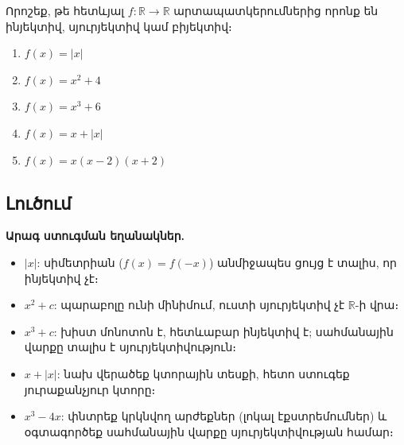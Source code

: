 \documentclass[12pt, a4paper]{article}
\newcommand{\R}{\mathbb{R}}
\begin{document}
\begin{theorybox}
\begin{center}
\end{center}
\end{theorybox}

\begin{problembox}
Որոշեք, թե հետևյալ $f : \R \to \R$ արտապատկերումներից որոնք են ինյեկտիվ, սյուրյեկտիվ կամ բիյեկտիվ։
\begin{enumerate}[label=(\alph*), nosep]
  \item $f(x) = |x|$
  \item $f(x) = x^2 + 4$
  \item $f(x) = x^3 + 6$
  \item $f(x) = x + |x|$
  \item $f(x) = x(x-2)(x+2)$
\end{enumerate}
\end{problembox}

\subsection*{Լուծում}

\textbf{Արագ ստուգման եղանակներ.}
\begin{itemize}[nosep]
  \item $|x|$: սիմետրիան ($f(x) = f(-x)$) անմիջապես ցույց է տալիս, որ ինյեկտիվ չէ։
  \item $x^2 + c$: պարաբոլը ունի մինիմում, ուստի սյուրյեկտիվ չէ $\mathbb{R}$-ի վրա։
  \item $x^3 + c$: խիստ մոնոտոն է, հետևաբար ինյեկտիվ է; սահմանային վարքը տալիս է սյուրյեկտիվություն։
  \item $x + |x|$: նախ վերածեք կտորային տեսքի, հետո ստուգեք յուրաքանչյուր կտորը։
  \item $x^3 - 4x$: փնտրեք կրկնվող արժեքներ (լոկալ էքստրեմումներ) և օգտագործեք սահմանային վարքը սյուրյեկտիվության համար։
\end{itemize}
\end{document}
